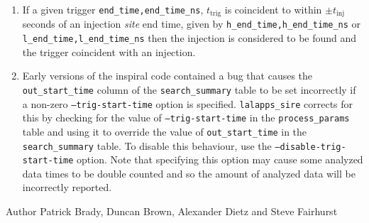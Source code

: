 \begin{entry}
\begin{enumerate}
\item If a given trigger \verb$end_time,end_time_ns$, $t_\mathrm{trig}$ is
coincident to within $\pm t_\mathrm{inj}$ seconds of an injection \emph{site}
end time, given by \verb$h_end_time,h_end_time_ns$ or
\verb$l_end_time,l_end_time_ns$ then the injection is considered to be found
and the trigger coincident with an injection.

\item Early versions of the inspiral code contained a bug that causes the
\verb$out_start_time$ column of the \verb$search_summary$ table to be set
incorrectly if a non-zero \texttt{--trig-start-time} option is specified.
\verb$lalapps_sire$ corrects for this by checking for the value of
\texttt{--trig-start-time} in the \verb$process_params$ table and using it to
override the value of \verb$out_start_time$ in the \verb$search_summary$
table. To disable this behaviour, use the \texttt{--disable-trig-start-time}
option. Note that specifying this option may cause some analyzed data times to
be double counted and so the amount of analyzed data will be incorrectly
reported.
\end{enumerate}

\item[Author] 
Patrick Brady, Duncan Brown, Alexander Dietz and Steve Fairhurst
\end{entry}


